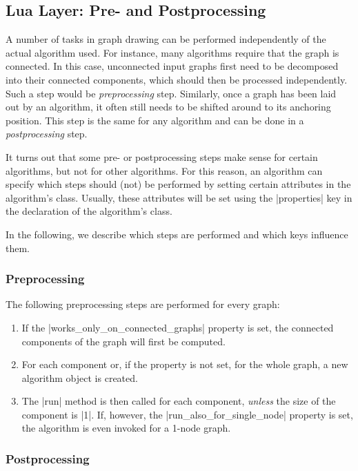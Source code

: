 \subsection{Lua Layer: Pre- and Postprocessing}

A number of tasks in graph drawing can be performed independently of
the actual algorithm used. For instance, many algorithms require that
the graph is connected. In this case, unconnected input graphs first
need to be decomposed into their connected components, which should
then be processed independently. Such a step would be
\emph{preprocessing} step. Similarly, once a graph has been laid out
by an algorithm, it often still needs to be shifted around to its
anchoring position. This step is the same for any algorithm and can be
done in a \emph{postprocessing} step.

It turns out that some pre- or postprocessing steps make sense for
certain algorithms, but not for other algorithms. For this reason, an
algorithm can specify which steps should (not) be performed by setting
certain attributes in the algorithm's class. Usually, these attributes
will be set using the |properties| key in the declaration of the
algorithm's class.

In the following, we describe which steps are performed and which keys
influence them.


\subsubsection{Preprocessing}

The following preprocessing steps are performed for every graph:
\begin{enumerate}
\item If the |works_only_on_connected_graphs| property is set, the
  connected components of the graph will first be computed.
\item For each component or, if the property is not set, for the whole
  graph, a new algorithm object is created.
\item The |run| method is then called for each component,
  \emph{unless} the size of the component is |1|. If, however, the
  |run_also_for_single_node| property is set, the algorithm is even
  invoked for a 1-node graph.
\end{enumerate}

\subsubsection{Postprocessing}

